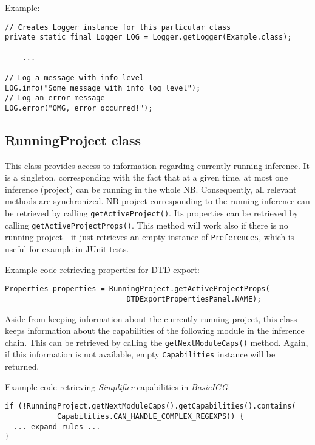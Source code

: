 \documentclass[a4paper,10pt,oneside]{article}
\begin{document}
\noindent Example:
\begin{verbatim}
// Creates Logger instance for this particular class
private static final Logger LOG = Logger.getLogger(Example.class);

    ...

// Log a message with info level
LOG.info("Some message with info log level");
// Log an error message
LOG.error("OMG, error occurred!");
\end{verbatim}

\subsection*{RunningProject class}

\par 
  This class provides access to information regarding currently running inference.
  It is a singleton, corresponding with the fact that at a given time, at most
  one inference (project) can be running in the whole NB. Consequently, all relevant methods
  are synchronized.
  NB project corresponding to the running inference can be retrieved by
  calling \texttt{getActiveProject()}. Its properties can be retrieved by
  calling \texttt{getActiveProjectProps()}. This
  method will work also if there is no running project - it just retrieves an
  empty instance of \texttt{Preferences}, which is useful for example in JUnit
  tests.

Example code retrieving properties for DTD export:
\begin{verbatim}
Properties properties = RunningProject.getActiveProjectProps(
                            DTDExportPropertiesPanel.NAME);
\end{verbatim}

\par 
  Aside from keeping information about the currently running project, this class
  keeps information about the capabilities of the following module in the inference
  chain. This can be retrieved by calling the \texttt{getNextModuleCaps()} method.
  Again, if this information is not available, empty \texttt{Capabilities}
  instance will be returned.

Example code retrieving \textit{Simplifier} capabilities
in \textit{BasicIGG}:
\begin{verbatim}
if (!RunningProject.getNextModuleCaps().getCapabilities().contains(
            Capabilities.CAN_HANDLE_COMPLEX_REGEXPS)) {
  ... expand rules ...
}
\end{verbatim}
\end{document}
